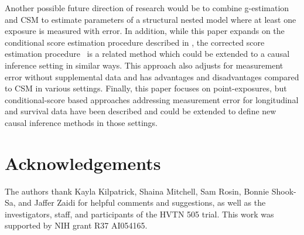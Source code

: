 \documentclass[useAMS,usenatbib,referee]{biom}
\begin{document}
Another possible future direction of research would be to combine g-estimation and CSM to estimate parameters of a structural nested model where at least one exposure is measured with error. In addition, while this paper expands on the conditional score estimation procedure described in \citet{stefanski1987}, the corrected score estimation procedure~\citep{nakamura1990} is a related method which could be extended to a causal inference setting in similar ways. This approach also adjusts for measurement error without supplemental data and has advantages and disadvantages compared to CSM in various settings. Finally, this paper focuses on point-exposures, but conditional-score based approaches addressing measurement error for longitudinal and survival data have been described and could be extended to define new causal inference methods in those settings.





\backmatter


\section*{Acknowledgements}

The authors thank Kayla Kilpatrick, Shaina Mitchell, Sam Rosin, Bonnie Shook-Sa, and Jaffer Zaidi for helpful comments and suggestions, as well as the investigators, staff, and participants of the HVTN 505 trial. This work was supported by NIH grant R37 AI054165. \vspace*{-8pt}


\end{document}
